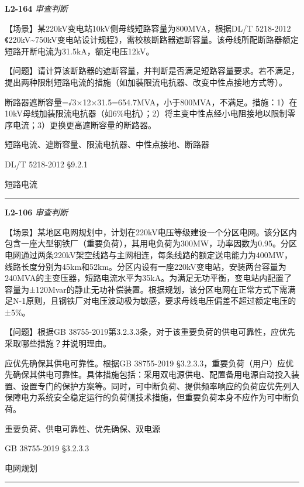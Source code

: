 \documentclass[12pt,a4paper]{ctexart}
\begin{document}
\noindent\textbf{L2-164} \hfill \textit{审查判断}
\begin{description}[leftmargin=1.5em,style=nextline,font=\normalfont]
  \item[Q:] 【场景】某220kV变电站10kV侧母线短路容量为800MVA，根据DL/T 5218-2012《220kV\textasciitilde{}750kV变电站设计规程》，需校核断路器遮断容量。该母线所配断路器额定短路开断电流为31.5kA，额定电压12kV。

【问题】请计算该断路器的遮断容量，并判断是否满足短路容量要求。若不满足，提出两种限制短路电流的措施（如加装限流电抗器、改变中性点接地方式等）。
  \item[A:] 断路器遮断容量=√3×12×31.5=654.7MVA，小于800MVA，不满足。措施：1）在10kV母线加装限流电抗器（如6\%电抗）；2）将主变中性点经小电阻接地以限制零序电流；3）更换更高遮断容量的断路器。
  \item[KW:] 短路电流、遮断容量、限流电抗器、中性点接地、断路器
  \item[Std:] DL/T 5218-2012 §9.2.1
  \item[Topic:] 短路电流
\end{description}
\vspace{4pt}
\hrule\vspace{6pt}

\noindent\textbf{L2-106} \hfill \textit{审查判断}
\begin{description}[leftmargin=1.5em,style=nextline,font=\normalfont]
  \item[Q:] 【场景】某地区电网规划中，计划在220kV电压等级建设一个分区电网。该分区内包含一座大型钢铁厂（重要负荷），其用电负荷为300MW，功率因数为0.95。分区电网通过两条220kV架空线路与主网相连，每条线路的额定送电能力为400MW，线路长度分别为45km和52km。分区内设有一座220kV变电站，安装两台容量为240MVA的主变压器，短路电流水平为35kA。为满足无功平衡，变电站内配置了容量为±120Mvar的静止无功补偿装置。根据规划，该分区电网在正常方式下需满足N-1原则，且钢铁厂对电压波动极为敏感，要求母线电压偏差不超过额定电压的±5\%。

【问题】根据GB 38755-2019第3.2.3.3条，对于该重要负荷的供电可靠性，应优先采取哪些措施？并说明理由。
  \item[A:] 应优先确保其供电可靠性。根据GB 38755-2019 §3.2.3.3，重要负荷（用户）应优先确保其供电可靠性。具体措施包括：采用双电源供电、配置备用电源自动投入装置、设置专门的保护方案等。同时，可中断负荷、提供频率响应的负荷应优先列入保障电力系统安全稳定运行的负荷侧技术措施，但重要负荷本身不应作为可中断负荷。
  \item[KW:] 重要负荷、供电可靠性、优先确保、双电源
  \item[Std:] GB 38755-2019 §3.2.3.3
  \item[Topic:] 电网规划
\end{description}
\vspace{4pt}
\hrule\vspace{6pt}
\end{document}
